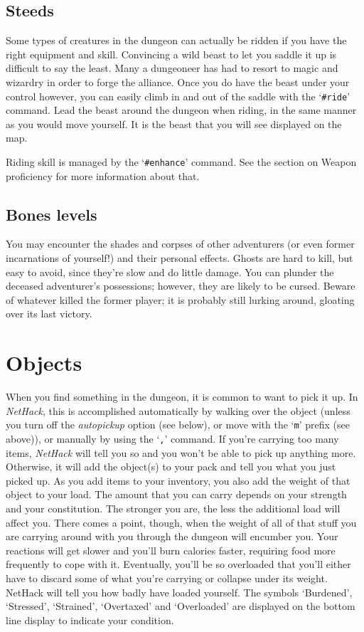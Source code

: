 \subsection*{Steeds}

Some types of creatures in the dungeon can actually be ridden if you
have the right equipment and skill.  Convincing a wild beast to let
you saddle it up is difficult to say the least.  Many a dungeoneer
has had to resort to magic and wizardry in order to forge the alliance.
Once you do have the beast under your control however, you can
easily climb in and out of the saddle with the `{\tt \#ride}' command.  Lead
the beast around the dungeon when riding, in the same manner as
you would move yourself.  It is the beast that you will see displayed
on the map.

Riding skill is managed by the `{\tt \#enhance}' command.  See the section
on Weapon proficiency for more information about that.

\subsection*{Bones levels}

You may encounter the shades and corpses of other adventurers (or even
former incarnations of yourself!) and their personal effects.  Ghosts
are hard to kill, but easy to avoid, since they're slow and do little
damage.  You can plunder the deceased adventurer's possessions;
however, they are likely to be cursed.  Beware of whatever killed the
former player; it is probably still lurking around, gloating over its
last victory.

\section{Objects}

When you find something in the dungeon, it is common to want to pick
it up.  In {\it NetHack}, this is accomplished automatically by walking over
the object (unless you turn off the {\it autopickup\/}
option (see below), or move with the `{\tt m}' prefix (see above)), or
manually by using the `{\tt ,}' command.
If you're carrying too many items, {\it NetHack\/} will tell you so and you
won't be able to pick up anything more.  Otherwise, it will add the object(s)
to your pack and tell you what you just picked up.
As you add items to your inventory, you also add the weight of that object
to your load.  The amount that you can carry depends on your strength and
your constitution.  The
stronger you are, the less the additional load will affect you.  There comes
a point, though, when the weight of all of that stuff you are carrying around
with you through the dungeon will encumber you.  Your reactions
will get slower and you'll burn calories faster, requiring food more frequently
to cope with it.  Eventually, you'll be so overloaded that you'll either have
to discard some of what you're carrying or collapse under its weight.
NetHack will tell you how badly have loaded yourself.  The symbols
`Burdened', `Stressed', `Strained', `Overtaxed' and `Overloaded' are
displayed on the bottom line display to indicate your condition.

